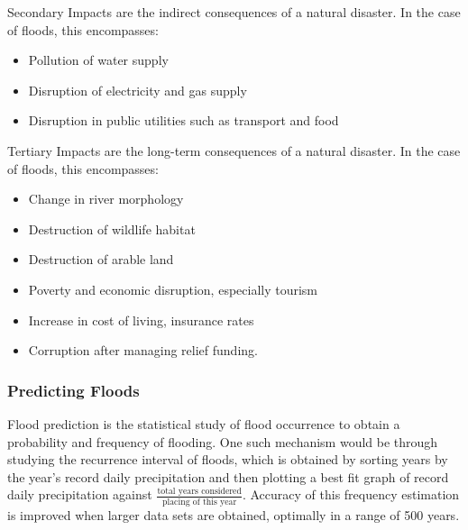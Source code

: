 \documentclass[../../main]{subfiles}
\begin{document}
	Secondary Impacts are the indirect consequences of a natural disaster. In the case of floods, this encompasses:

	\begin{itemize}
		\item Pollution of water supply
		\item Disruption of electricity and gas supply
		\item Disruption in public utilities such as transport and food
	\end{itemize}

	Tertiary Impacts are the long-term consequences of a natural disaster. In the case of floods, this encompasses:

	\begin{itemize}
		\item Change in river morphology
		\item Destruction of wildlife habitat
		\item Destruction of arable land
		\item Poverty and economic disruption, especially tourism
		\item Increase in cost of living, insurance rates
		\item Corruption after managing relief funding.
	\end{itemize}

\subsubsection{Predicting Floods}

	Flood prediction is the statistical study of flood occurrence to obtain a probability and frequency of flooding. One such mechanism would be through studying the recurrence interval of floods, which is obtained by sorting years by the year's record daily precipitation and then plotting a best fit graph of record daily precipitation against \(\frac{\text{total years considered}}{\text{placing of this year}}\). Accuracy of this frequency estimation is improved when larger data sets are obtained, optimally in a range of 500 years.

\end{document}
